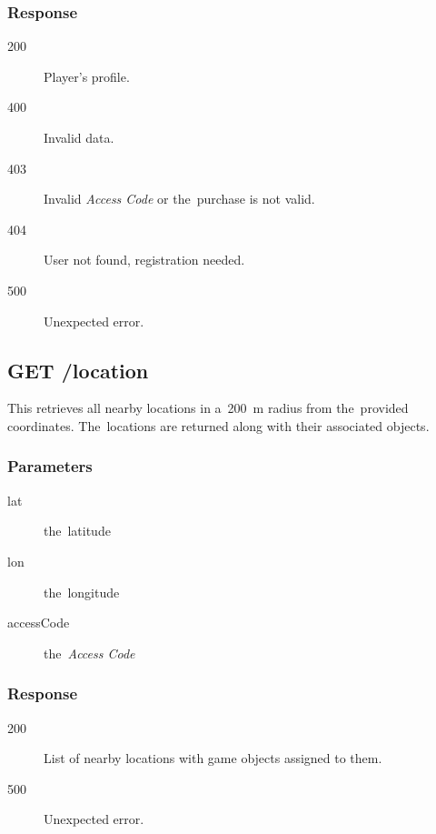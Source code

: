 \subsubsection*{Response}

\begin{description}

	\item[200] Player's profile.

	\item[400] Invalid data.

	\item[403] Invalid \textit{Access Code} or the~purchase is not valid.

	\item[404] User not found, registration needed.

	\item[500] Unexpected error.

\end{description}

\subsection{GET /location}

This retrieves all nearby locations in a~200~m radius from the~provided coordinates. The~locations are returned along with their associated objects.

\subsubsection*{Parameters}

\begin{description}

	\item[lat] the~latitude

	\item[lon] the~longitude

	\item[accessCode] the~\textit{Access Code}

\end{description}

\subsubsection*{Response}

\begin{description}

	\item[200] List of nearby locations with game objects assigned to them.

	\item[500] Unexpected error.

\end{description}

